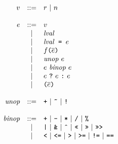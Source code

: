 \documentclass{article}
\newcommand{\ternary}[3]{{#1}\ \mathjs{?}\ {#2}\ \mathjs{:}\ {#3}}
\newcommand{\funcall}[2]{{#1}\mathjs{(}{#2}\mathjs{)}}
\newcommand{\paren}[1]{\mathjs{(}{#1}\mathjs{)}}
\newcommand{\seq}[1]{\overline{{#1}}}
\newcommand{\mathjs}[1]{\mbox{\texttt{{#1}}}}
\newcommand{\getprop}[2]{{#1}\mathjs{[}{#2}\mathjs{]}}
\newcommand{\longlong}[2]{\mathjs{[}{#1},{#2}\mathjs{]}}
\begin{document}
\[
\begin{array}{rcl}
v & ::= & r ~|~ n \\
\\
e & ::= & v \\
  &  |  & \mathit{lval} \\
  &  |  & \mathit{lval}\mathjs{ = }e \\
  &  |  & \funcall{f}{\seq{e}} \\
  &  |  & \mathit{unop}\ e \\
  &  |  & e\ \mathit{binop}\ e \\
  &  |  & \ternary{e}{e}{e} \\
  &  |  & \paren{\seq{e}} \\
\\
\mathit{unop} & ::= & \mathjs{+} ~|~ \mathjs{\~{}} ~|~ \mathjs{!} \\
\\
\mathit{binop} & ::= & \mathjs{+} ~|~ \mathjs{-} ~|~ \mathjs{*} ~|~ \mathjs{/} ~|~ \mathjs{\%} \\
               &  |  & \mathjs{|} ~|~ \mathjs{\&} ~|~ \mathjs{\^{}} ~|~ \mathjs{<<} ~|~ \mathjs{>>} ~|~ \mathjs{>>>} \\
               &  |  & \mathjs{<} ~|~ \mathjs{<=} ~|~ \mathjs{>} ~|~ \mathjs{>=} ~|~ \mathjs{!=} ~|~ \mathjs{==} \\

\end{array}\]
\end{document}
